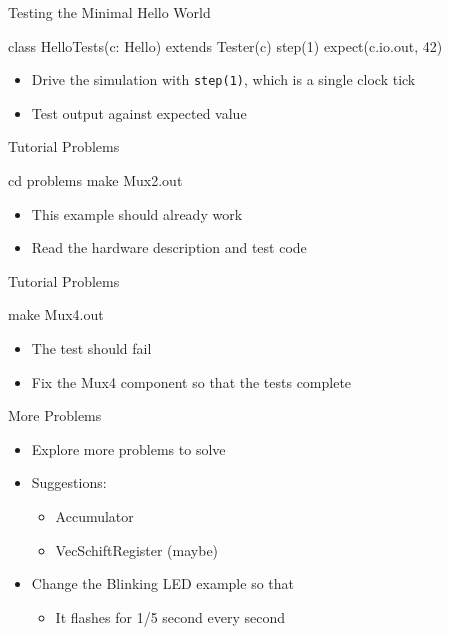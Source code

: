 \documentclass[xcolor=pdflatex,dvipsnames,table]{beamer}
\newcommand{\code}[1]{{\texttt{#1}}}
\begin{document}
\begin{frame}[fragile]{Testing the Minimal Hello World}
\begin{chisel}
class HelloTests(c: Hello) extends Tester(c) {
  step(1)
  expect(c.io.out, 42)
}
\end{chisel}
\begin{itemize}
\item Drive the simulation with \code{step(1)}, which is a single clock tick
\item Test output against expected value
\end{itemize}
\end{frame}

\begin{frame}[fragile]{Tutorial Problems}
\begin{chisel}
cd problems
make Mux2.out
\end{chisel}
\begin{itemize}
\item This example should already work
\item Read the hardware description and test code
\end{itemize}
\end{frame}

\begin{frame}[fragile]{Tutorial Problems}
\begin{chisel}
make Mux4.out
\end{chisel}
\begin{itemize}
\item The test should fail
\item Fix the Mux4 component so that the tests complete
\end{itemize}
\end{frame}

\begin{frame}[fragile]{More Problems}
\begin{itemize}
\item Explore more problems to solve
\item Suggestions:
\begin{itemize}
\item Accumulator
\item VecSchiftRegister (maybe)
\end{itemize}
\item Change the Blinking LED example so that
\begin{itemize}
\item It flashes for 1/5 second every second
\end{itemize}
\end{itemize}
\end{frame}
\end{document}
